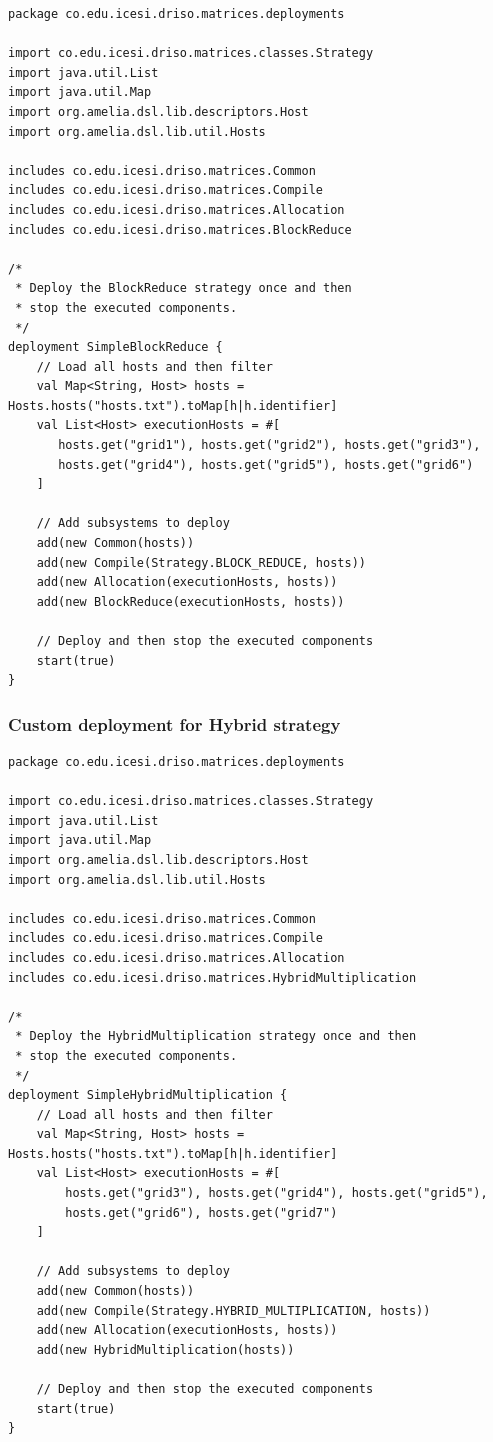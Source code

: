 \documentclass{article}
\begin{document}
\begin{lstlisting}[style=amelia,caption=Custom deployment for BlockReduce strategy]
package co.edu.icesi.driso.matrices.deployments

import co.edu.icesi.driso.matrices.classes.Strategy
import java.util.List
import java.util.Map
import org.amelia.dsl.lib.descriptors.Host
import org.amelia.dsl.lib.util.Hosts

includes co.edu.icesi.driso.matrices.Common
includes co.edu.icesi.driso.matrices.Compile
includes co.edu.icesi.driso.matrices.Allocation
includes co.edu.icesi.driso.matrices.BlockReduce

/*
 * Deploy the BlockReduce strategy once and then
 * stop the executed components.
 */
deployment SimpleBlockReduce {
	// Load all hosts and then filter
	val Map<String, Host> hosts = Hosts.hosts("hosts.txt").toMap[h|h.identifier]
	val List<Host> executionHosts = #[
	   hosts.get("grid1"), hosts.get("grid2"), hosts.get("grid3"),
	   hosts.get("grid4"), hosts.get("grid5"), hosts.get("grid6")
	]

	// Add subsystems to deploy
	add(new Common(hosts))
	add(new Compile(Strategy.BLOCK_REDUCE, hosts))
	add(new Allocation(executionHosts, hosts))
	add(new BlockReduce(executionHosts, hosts))

	// Deploy and then stop the executed components
	start(true)
}
\end{lstlisting}

\subsubsection{Custom deployment for Hybrid strategy}

\begin{lstlisting}[style=amelia,caption=Custom deployment for Hybrid strategy]
package co.edu.icesi.driso.matrices.deployments

import co.edu.icesi.driso.matrices.classes.Strategy
import java.util.List
import java.util.Map
import org.amelia.dsl.lib.descriptors.Host
import org.amelia.dsl.lib.util.Hosts

includes co.edu.icesi.driso.matrices.Common
includes co.edu.icesi.driso.matrices.Compile
includes co.edu.icesi.driso.matrices.Allocation
includes co.edu.icesi.driso.matrices.HybridMultiplication

/*
 * Deploy the HybridMultiplication strategy once and then
 * stop the executed components.
 */
deployment SimpleHybridMultiplication {	 
    // Load all hosts and then filter
    val Map<String, Host> hosts = Hosts.hosts("hosts.txt").toMap[h|h.identifier]
    val List<Host> executionHosts = #[
        hosts.get("grid3"), hosts.get("grid4"), hosts.get("grid5"),
        hosts.get("grid6"), hosts.get("grid7")
    ]

    // Add subsystems to deploy
    add(new Common(hosts))
    add(new Compile(Strategy.HYBRID_MULTIPLICATION, hosts))
    add(new Allocation(executionHosts, hosts))
    add(new HybridMultiplication(hosts))

    // Deploy and then stop the executed components
    start(true)
}
\end{lstlisting}
\end{document}
